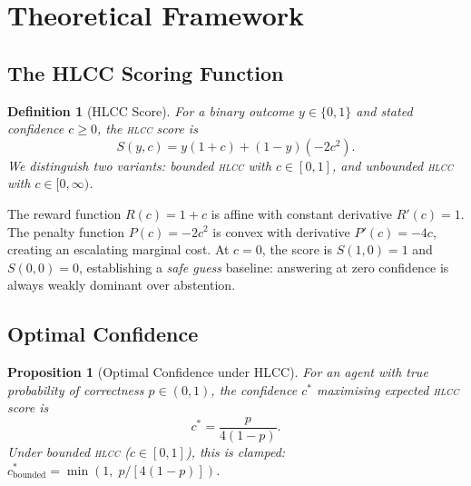 \documentclass[11pt,a4paper]{article}
\newtheorem{proposition}{Proposition}
\newtheorem{definition}{Definition}
\newcommand{\hlcc}{\textsc{hlcc}}
\newcommand{\cstar}{c^{*}}
\begin{document}
\section{Theoretical Framework}
\label{sec:theory}

\subsection{The HLCC Scoring Function}

\begin{definition}[HLCC Score]
  For a binary outcome $y \in \{0,1\}$ and stated confidence
  $c \geq 0$, the \hlcc{} score is
  \begin{equation}
    S(y, c) = y(1 + c) + (1-y)(-2c^{2}).
  \end{equation}
  We distinguish two variants: \emph{bounded} \hlcc{} with
  $c \in [0,1]$, and \emph{unbounded} \hlcc{} with
  $c \in [0,\infty)$.
\end{definition}

The reward function $R(c) = 1 + c$ is affine with constant derivative
$R'(c) = 1$.  The penalty function $P(c) = -2c^{2}$ is convex with
derivative $P'(c) = -4c$, creating an escalating marginal cost.  At
$c = 0$, the score is $S(1,0) = 1$ and $S(0,0) = 0$, establishing a
\emph{safe guess} baseline: answering at zero confidence is always
weakly dominant over abstention.

\subsection{Optimal Confidence}

\begin{proposition}[Optimal Confidence under HLCC]
\label{prop:optimal}
  For an agent with true probability of correctness $p \in (0,1)$, the
  confidence $\cstar$ maximising expected \hlcc{} score is
  \begin{equation}
    \cstar = \frac{p}{4(1-p)}.
    \label{eq:cstar}
  \end{equation}
  Under bounded \hlcc{} ($c \in [0,1]$), this is clamped:
  $\cstar_{\text{bounded}} = \min(1,\; p/[4(1{-}p)])$.
\end{proposition}
\end{document}
